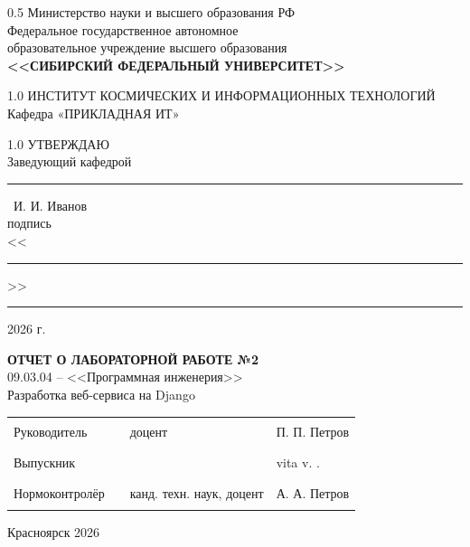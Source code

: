 \documentclass[paper=a4, fontsize=14pt, pagesize, DIV=calc, oneside]{scrreport}
\begin{document}
\begin{titlepage}
    \begin{center}
        \begin{spacing}{0.5}
        Министерство науки и высшего образования РФ\\
        {\small Федеральное государственное автономное}\\
        {\small образовательное учреждение высшего образования}\\
        \textbf{\small<<СИБИРСКИЙ ФЕДЕРАЛЬНЫЙ УНИВЕРСИТЕТ>>}\\
        \end{spacing}
        \vfill
        \begin{spacing}{1.0}
        ИНСТИТУТ КОСМИЧЕСКИХ И ИНФОРМАЦИОННЫХ ТЕХНОЛОГИЙ\\
        Кафедра «ПРИКЛАДНАЯ ИТ»\\
        \end{spacing}
    \end{center}        
    
    \begin{minipage}[h]{0.45\linewidth}\hfil\end{minipage}
    \hspace{5mm}
    \begin{minipage}[h]{0.45\linewidth}
        \begin{spacing}{1.0}
            УТВЕРЖДАЮ\\
            Заведующий кафедрой\\[10mm]
            \rule{2cm}{.1pt}~И. И. Иванов\\
            {\small подпись}\\[10mm]
            <<\rule{1cm}{.1pt}>>\rule{2.5cm}{.1pt} 2026 г.
        \end{spacing}
    \end{minipage}
    
    \vspace{7mm}
    \vfill
    \begin{center}
        {\Large \textbf{ОТЧЕТ О ЛАБОРАТОРНОЙ РАБОТЕ №2}}\\[7mm]
        09.03.04 -- <<Программная инженерия>>\\[3mm]
        Разработка веб-сервиса на Django
    \end{center}
    \vfill
    
\noindent
\begin{tabular}{@{} p{} >{\centering\arraybackslash} p{} p{} p{} @{}}
    Руководитель & \rule{3.5cm}{.1pt} & доцент & П. П. Петров \\
    Выпускник & \rule{3.5cm}{.1pt} & & vita v. . \\
    Нормоконтролёр & \rule{3.5cm}{.1pt} & канд. техн. наук, доцент & А. А. Петров \\
\end{tabular}

\vfill
\begin{center}Красноярск 2026\end{center}
\end{titlepage}
\restoregeometry
\end{document}
